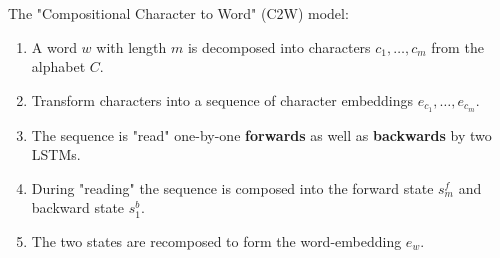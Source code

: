 \documentclass[11pt, a4paper, landscape]{article}
\begin{document}
%

\NewPage{}

\vfill
The "Compositional Character to Word" (C2W) model:
\begin{enumerate}
\item A word $w$ with length $m$ is decomposed into characters $c_1, \dots, c_m$ from the alphabet $C$.
\item Transform characters into a sequence of character embeddings $e_{c_1}, \dots, e_{c_m}$.
\item The sequence is "read" one-by-one \textbf{forwards} as well as \textbf{backwards} by two LSTMs.
\item During "reading" the sequence is composed into the forward state $s_m^f$ and backward state $s_1^b$.
\item The two states are recomposed to form the word-embedding $e_w$.
\end{enumerate}
\vfill

\NewPage{}
\end{document}
